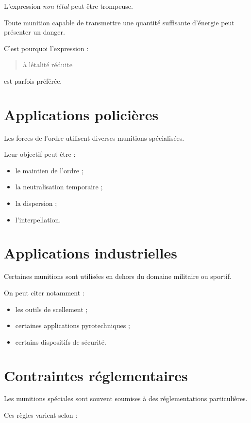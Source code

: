 L'expression \emph{non létal} peut être trompeuse.

Toute munition capable de transmettre une quantité suffisante d'énergie peut
présenter un danger.

C'est pourquoi l'expression :

\begin{quote}
à létalité réduite
\end{quote}

est parfois préférée.

\section{Applications policières}

Les forces de l'ordre utilisent diverses munitions spécialisées.

Leur objectif peut être :

\begin{itemize}
    \item le maintien de l'ordre ;
    \item la neutralisation temporaire ;
    \item la dispersion ;
    \item l'interpellation.
\end{itemize}

\section{Applications industrielles}

Certaines munitions sont utilisées en dehors du domaine militaire ou sportif.

On peut citer notamment :

\begin{itemize}
    \item les outils de scellement ;
    \item certaines applications pyrotechniques ;
    \item certains dispositifs de sécurité.
\end{itemize}

\section{Contraintes réglementaires}

Les munitions spéciales sont souvent soumises à des réglementations
particulières.

Ces règles varient selon :

